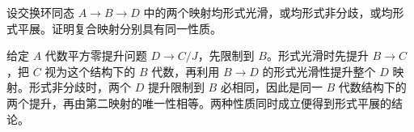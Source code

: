 \begin{exercise}\label{b3:ex:14-formal-composition}
	设交换环同态 \(A\to B\to D\) 中的两个映射均形式光滑，或均形式非分歧，或均形式平展。证明复合映射分别具有同一性质。
\end{exercise}
\begin{solution}
	给定 \(A\) 代数平方零提升问题 \(D\to C/J\)，先限制到 \(B\)。形式光滑时先提升 \(B\to C\)，把 \(C\) 视为这个结构下的 \(B\) 代数，再利用 \(B\to D\) 的形式光滑性提升整个 \(D\) 映射。形式非分歧时，两个 \(D\) 提升限制到 \(B\) 必相同，因此是同一 \(B\) 代数结构下的两个提升，再由第二映射的唯一性相等。两种性质同时成立便得到形式平展的结论。
\end{solution}
